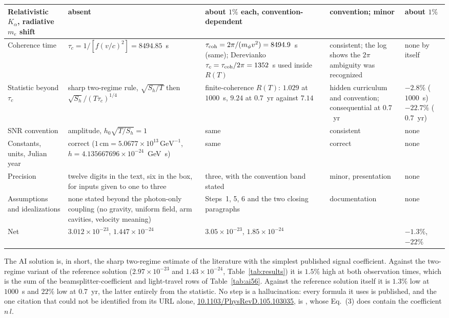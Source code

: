 \begin{longtable}{p{3.0cm}p{3.1cm}p{3.4cm}p{4.2cm}p{1.9cm}}
\midrule
Relativistic $K_\alpha$, radiative $m_e$ shift & absent & about $1\%$ each, convention-dependent & convention; minor & about $1\%$ \\
\midrule
Coherence time & $\tau_c=1/[f(v/c)^2]=8494.85$~s & $\tau_{\rm coh}=2\pi/(m_\phi v^2)=8494.9$~s (same); Derevianko $\tau_c=\tau_{\rm coh}/2\pi=1352$~s used inside $R(T)$ & consistent; the log shows the $2\pi$ ambiguity was recognized & none by itself \\
\midrule
Statistic beyond $\tau_c$ & sharp two-regime rule, $\sqrt{S_h/T}$ then $\sqrt{S_h}/(T\tau_c)^{1/4}$ & finite-coherence $R(T)$: $1.029$ at $1000$~s, $9.24$ at $0.7$~yr against $7.14$ & hidden curriculum and convention; consequential at $0.7$~yr & $-2.8\%$ ($1000$~s) \newline $-22.7\%$ ($0.7$~yr) \\
\midrule
SNR convention & amplitude, $h_0\sqrt{T/S_h}=1$ & same & consistent & none \\
\midrule
Constants, units, Julian year & correct ($1\,\mathrm{cm}=5.0677\times10^{13}\,\mathrm{GeV}^{-1}$, $h=4.135667696\times10^{-24}$~GeV~s) & same & correct & none \\
\midrule
Precision & twelve digits in the text, six in the box, for inputs given to one to three & three, with the convention band stated & minor, presentation & none \\
\midrule
Assumptions and idealizations & none stated beyond the photon-only coupling (no gravity, uniform field, arm cavities, velocity meaning) & Steps~1, 5, 6 and the two closing paragraphs & documentation & none \\
\midrule
Net & $3.012\times10^{-23}$, $1.447\times10^{-24}$ & $3.05\times10^{-23}$, $1.85\times10^{-24}$ & & $-1.3\%$, $-22\%$ \\
\end{longtable}
\endgroup

The AI solution is, in short, the sharp two-regime estimate of the literature with the simplest published signal coefficient. Against the two-regime variant of the reference solution ($2.97\times10^{-23}$ and $1.43\times10^{-24}$, Table~\ref{tab:results}) it is $1.5\%$ high at both observation times, which is the sum of the beamsplitter-coefficient and light-travel rows of Table~\ref{tab:ai56}. Against the reference solution itself it is $1.3\%$ low at $1000$~s and $22\%$ low at $0.7$~yr, the latter entirely from the statistic. No step is a hallucination: every formula it uses is published, and the one citation that could not be identified from its URL alone, \href{https://doi.org/10.1103/PhysRevD.105.103035}{10.1103/PhysRevD.105.103035}, is \citet{Miller2022}, whose Eq.~(3) does contain the coefficient $n\,l$.


